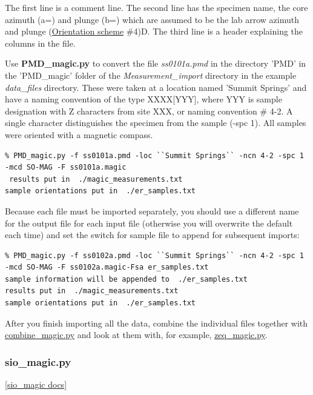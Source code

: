 \documentclass[11pt]{book}
\begin{document}
{{The first line is a comment line.  The second line has the specimen name, the core azimuth (a=) and plunge (b=) which are assumed to be the lab arrow azimuth and plunge (\href{#orientation_schemes}{Orientation scheme} \#4)D.   The third line is a header explaining the columns in the file.


Use {\bf PMD\_magic.py} to convert the file {\it ss0101a.pmd} in the directory 'PMD' in the 'PMD\_magic' folder of the {\it Measurement\_import} directory in the example {\it data\_files } directory.  These were taken at a location named 'Summit Springs' and have a naming convention of the type XXXX[YYY], where  YYY is sample designation with Z characters from site XXX, or naming convention \# 4-2.  A single character distinguishes the specimen from the sample (-spc 1).  All samples were oriented with a magnetic compass.

\begin{verbatim}
% PMD_magic.py -f ss0101a.pmd -loc ``Summit Springs`` -ncn 4-2 -spc 1 -mcd SO-MAG -F ss0101a.magic
 results put in  ./magic_measurements.txt
sample orientations put in  ./er_samples.txt
\end{verbatim}

Because each file must be imported separately, you should use a different name for the output file for each input file (otherwise you will overwrite the default each time) and set the switch  for sample file to append for subsequent imports:

\begin{verbatim}
% PMD_magic.py -f ss0102a.pmd -loc ``Summit Springs`` -ncn 4-2 -spc 1 -mcd SO-MAG -F ss0102a.magic-Fsa er_samples.txt
sample information will be appended to  ./er_samples.txt
results put in  ./magic_measurements.txt
sample orientations put in  ./er_samples.txt
\end{verbatim}
After you finish importing all the data, combine the individual files together with \href{#combine_magic.py}{combine\_magic.py} and look at them with, for example, \href{#zeq_magic.py}{zeq\_magic.py}.


\subsubsection {sio\_magic.py}
\href{https://github.com/PmagPy/PmagPy/blob/master/programs/sio_magic.py}{[sio\_magic docs]}


}}
\end{document}
